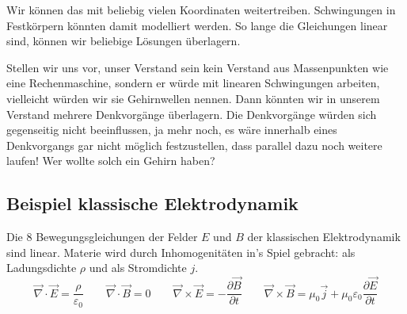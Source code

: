 \documentclass[12pt]{book}
\begin{document}
Wir können das mit beliebig vielen Koordinaten weitertreiben. Schwingungen in Festkörpern könnten damit modelliert werden. So lange die Gleichungen linear sind, können wir beliebige Lösungen überlagern.

Stellen wir uns vor, unser Verstand sein kein Verstand aus Massenpunkten wie eine Rechenmaschine, sondern er würde mit linearen Schwingungen arbeiten, vielleicht würden wir sie Gehirnwellen nennen. Dann könnten wir in unserem Verstand mehrere Denkvorgänge überlagern. Die Denkvorgänge würden sich gegenseitig nicht beeinflussen, ja mehr noch, es wäre innerhalb eines Denkvorgangs gar nicht möglich festzustellen, dass parallel dazu noch weitere laufen! Wer wollte solch ein Gehirn haben?

\subsection{Beispiel klassische Elektrodynamik}

Die 8 Bewegungsgleichungen der Felder $E$ und $B$ der klassischen Elektrodynamik sind linear. Materie wird durch Inhomogenitäten in's Spiel gebracht: als Ladungsdichte $\rho$ und als Stromdichte $j$.
\begin{equation*} 
\vec \nabla \cdot \vec {E}=\frac {\rho }{\varepsilon _0} \quad\quad \vec \nabla \cdot \vec B=0 \quad\quad \vec \nabla \times \vec {E}=-\frac {\partial \vec {B}}{\partial t} \quad\quad \vec {\nabla }\times \vec {B}=\mu _0 \vec {j}+\mu _0\varepsilon _0 \frac {\partial \vec {E}}{\partial t} 
\end{equation*}
\end{document}
